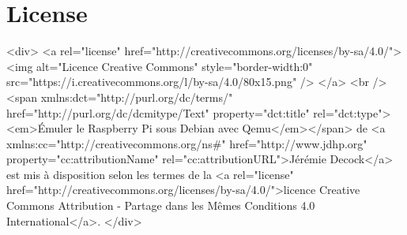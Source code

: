 \documentclass{article}
\begin{document}
    \section*{License}\label{sec:license}

    \begin{rawhtml}

        <div>
            <a rel="license" href="http://creativecommons.org/licenses/by-sa/4.0/">
                <img alt="Licence Creative Commons" style="border-width:0" src="https://i.creativecommons.org/l/by-sa/4.0/80x15.png" />
            </a>
            <br />
            <span xmlns:dct="http://purl.org/dc/terms/" href="http://purl.org/dc/dcmitype/Text" property="dct:title" rel="dct:type"><em>Émuler le Raspberry Pi sous Debian avec Qemu</em></span> de <a xmlns:cc="http://creativecommons.org/ns#" href="http://www.jdhp.org" property="cc:attributionName" rel="cc:attributionURL">Jérémie Decock</a> est mis à disposition selon les termes de la <a rel="license" href="http://creativecommons.org/licenses/by-sa/4.0/">licence Creative Commons Attribution -  Partage dans les Mêmes Conditions 4.0 International</a>.
        </div>

    \end{rawhtml}
\fi
\end{document}
